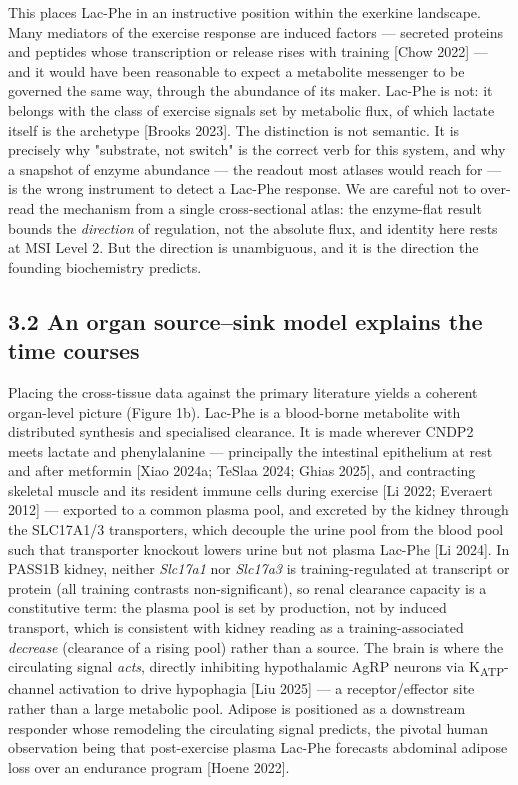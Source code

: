 \documentclass[11pt]{article}
\begin{document}
This places Lac-Phe in an instructive position within the exerkine landscape. Many mediators
of the exercise response are induced factors --- secreted proteins and peptides whose
transcription or release rises with training [Chow 2022] --- and it would have been reasonable
to expect a metabolite messenger to be governed the same way, through the abundance of its
maker. Lac-Phe is not: it belongs with the class of exercise signals set by metabolic flux,
of which lactate itself is the archetype [Brooks 2023]. The distinction is not semantic. It
is precisely why "substrate, not switch" is the correct verb for this system, and why a
snapshot of enzyme abundance --- the readout most atlases would reach for --- is the wrong
instrument to detect a Lac-Phe response. We are careful not to over-read the mechanism from
a single cross-sectional atlas: the enzyme-flat result bounds the \textit{direction} of regulation,
not the absolute flux, and identity here rests at MSI Level 2. But the direction is
unambiguous, and it is the direction the founding biochemistry predicts.

\subsection*{3.2 An organ source--sink model explains the time courses}

Placing the cross-tissue data against the primary literature yields a coherent organ-level
picture (Figure 1b). Lac-Phe is a blood-borne metabolite with distributed synthesis and
specialised clearance. It is made wherever CNDP2 meets lactate and phenylalanine ---
principally the intestinal epithelium at rest and after metformin [Xiao 2024a; TeSlaa 2024;
Ghias 2025], and contracting skeletal muscle and its resident immune cells during exercise
[Li 2022; Everaert 2012] --- exported to a common plasma pool, and excreted by the kidney
through the SLC17A1/3 transporters, which decouple the urine pool from the blood pool such
that transporter knockout lowers urine but not plasma Lac-Phe [Li 2024]. In PASS1B kidney,
neither \textit{Slc17a1} nor \textit{Slc17a3} is training-regulated at transcript or protein
(all training contrasts non-significant), so renal clearance capacity is a constitutive term:
the plasma pool is set by production, not by induced transport, which is consistent with
kidney reading as a training-associated \textit{decrease} (clearance of a rising pool) rather
than a source. The brain is where
the circulating signal \textit{acts}, directly inhibiting hypothalamic AgRP neurons via
K\textsubscript{ATP}-channel activation to drive hypophagia [Liu 2025] --- a receptor/effector site rather
than a large metabolic pool. Adipose is positioned as a downstream responder whose
remodeling the circulating signal predicts, the pivotal human observation being that
post-exercise plasma Lac-Phe forecasts abdominal adipose loss over an endurance program
[Hoene 2022].
\end{document}

